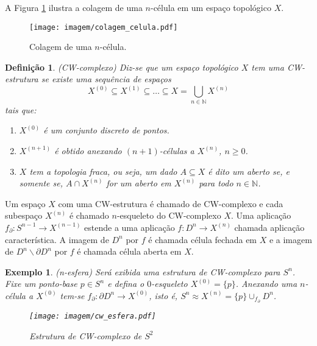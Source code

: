 \documentclass[12pt]{book}
\newtheorem{definicao}[teorema]{Definição}
\newtheorem{exemplo}[teorema]{Exemplo}
\newcommand{\celula}[2]{D^{#1}_{#2}}
\newcommand{\complementar}[2]{#1 \backslash #2}
\newcommand{\skeleton}[1]{X^{(#1)}}
\begin{document}
	A Figura \ref{figura_colagem_celula} ilustra a colagem de uma $n$-célula em um espaço topológico $X$.
	
	\begin{figure}[!h]
		\centering
		\texttt{[image: imagem/colagem\_celula.pdf]}
		\caption{Colagem de uma $n$-célula.}
		\label{figura_colagem_celula}
	\end{figure}
	
	\begin{definicao}
		(CW-complexo) Diz-se que um espaço topológico $X$ tem uma CW-estrutura se existe uma sequência de espaços
		$$
		\skeleton{0} \subseteq \skeleton{1} \subseteq \dots \subseteq X = \bigcup \limits_{n\in \mathbb{N}} \skeleton{n}
		$$ 
		tais que:
		\begin{enumerate}
			\item $\skeleton{0}$ é um conjunto discreto de pontos.
			
			\item $\skeleton{n+1}$ é obtido anexando $(n+1)$-células a $\skeleton{n}$, $n\geq0$.
			
			\item $X$ tem a topologia fraca, ou seja, um dado $A \subseteq X$ é dito um aberto se, e somente se, $A \cap \skeleton{n}$ for um aberto em $\skeleton{n}$ para todo $n \in \mathbb{N}$.
		\end{enumerate}
	\end{definicao}
	
	Um espaço $X$ com uma CW-estrutura é chamado de CW-complexo e cada subespaço $\skeleton{n}$ é chamado $n$-esqueleto do CW-complexo $X$. Uma aplicação $f_{\partial}:S^{n-1} \to \skeleton{n-1}$ estende a uma aplicação $f:D^{n} \to \skeleton{n}$ chamada aplicação característica. A imagem de $D^{n}$ por $f$ é chamada célula fechada em $X$ e a imagem de $\complementar{D^{n}}{\partial D^{n}} $ por $f$ é chamada célula aberta em $X$.
	
	\begin{exemplo}\label{exemplo_cw_n_esfera}
		(n-esfera) Será exibida uma estrutura de CW-complexo para $S^{n}$. Fixe um ponto-base $p \in S^{n}$ e defina o $0$-esqueleto $\skeleton{0}=\{p\}$. Anexando uma $n$-célula a $\skeleton{0}$ tem-se $f_{\partial}: \partial D^{n} \to \skeleton{0}$, isto é, $S^{n} \approx \skeleton{n} = \{p\}\cup_{f_{\partial}} \celula{n}{}$.
		\begin{figure}[!h]
			\centering
			\texttt{[image: imagem/cw\_esfera.pdf]}
			\caption{Estrutura de CW-complexo de $S^{2 }$}
		\end{figure}
	\end{exemplo}
\end{document}
